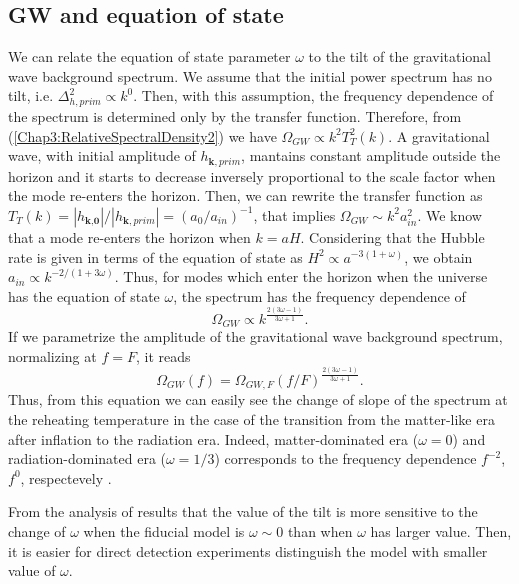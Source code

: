 \documentclass[11pt,a4paper,twoside]{book}
\begin{document}
\subsection{GW and equation of state}
We can relate the equation of state parameter $\omega$ to the tilt of the gravitational wave background spectrum. We assume that the initial power spectrum has no tilt, i.e. $ \Delta_{h,prim}^{2} \propto k^{0} $. Then, with this assumption, the frequency dependence of the spectrum is determined only by the transfer function. Therefore, from (\ref{Chap3:RelativeSpectralDensity2}) we have $\Omega_{GW} \propto k^{2}T^{2}_{T}(k)$.  A gravitational wave, with  initial amplitude of $ h_{\textbf{k},prim} $, mantains constant amplitude outside the horizon and it starts to decrease inversely proportional to the scale factor when the mode re-enters the horizon. Then, we can rewrite the transfer function as $ T_{T}(k) = |h_{\textbf{k,0}}|/|h_{\textbf{k},prim}| = (a_{0}/a_{in})^{-1} $, that implies $ \Omega_{GW} \sim k^{2}a^{2}_{in} $. We know that a mode re-enters the horizon  when $ k = aH $. Considering that the Hubble rate is given in terms of the equation of state as $ H^{2} \propto a^{-3(1+\omega)} $, we obtain $ a_{in} \propto k^{-2/(1+3\omega)} $. Thus, for modes which enter the horizon when the universe has the equation of state $\omega$, the spectrum has the frequency dependence of
\begin{equation}
	\label{Chap3:SpectrumFrequencyDependence}
	\Omega_{GW} \propto k^{\frac{2(3\omega - 1)}{3\omega + 1}}.
\end{equation} 
If we parametrize  the amplitude of the gravitational wave background spectrum, normalizing at $ f=F $, it reads
\begin{equation}
	\label{Chap3:SpectrumFrequencyDependenceParametrization}
	\Omega_{GW}(f) = \Omega_{GW,F}(f/F)^{\frac{2(3\omega - 1)}{3\omega + 1}}.
\end{equation}
Thus, from this equation we can easily see the change of slope of the spectrum at the reheating temperature in the case of the transition from the matter-like era after inflation to the radiation era. Indeed, matter-dominated era ($ \omega=0 $) and radiation-dominated era ($\omega=1/3$) corresponds to the frequency dependence $ f^{-2} $, $ f^{0} $, respectevely \cite{Chap3:ProspectsForDeterminationWithDetectors}. 

From the analysis of \cite{Chap3:ProspectsForDeterminationWithDetectors} results that the value of the tilt is more sensitive to the change of $\omega$ when the fiducial model is $ \omega \sim 0 $ than when $\omega$ has larger value. Then, it is easier for direct detection experiments  distinguish the model with smaller value of $\omega$.
\end{document}
